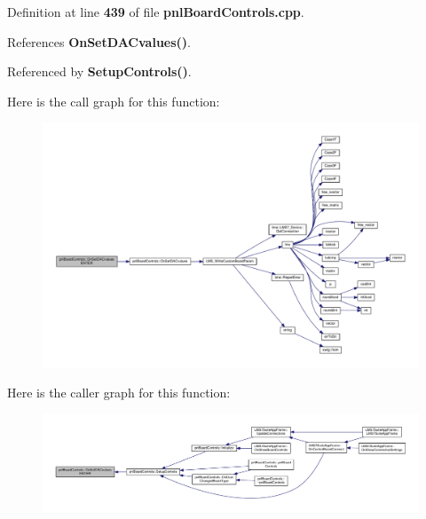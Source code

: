 Definition at line {\bf 439} of file {\bf pnl\+Board\+Controls.\+cpp}.



References {\bf On\+Set\+D\+A\+Cvalues()}.



Referenced by {\bf Setup\+Controls()}.



Here is the call graph for this function\+:
\nopagebreak
\begin{figure}[H]
\begin{center}
\leavevmode
\includegraphics[width=350pt]{df/d93/classpnlBoardControls_ac88d242daa497d1aa66e3ddd03e29f98_cgraph}
\end{center}
\end{figure}




Here is the caller graph for this function\+:
\nopagebreak
\begin{figure}[H]
\begin{center}
\leavevmode
\includegraphics[width=350pt]{df/d93/classpnlBoardControls_ac88d242daa497d1aa66e3ddd03e29f98_icgraph}
\end{center}
\end{figure}


